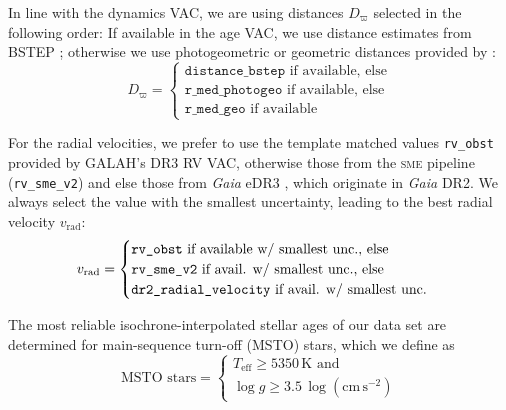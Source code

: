 \documentclass[fleqn,usenatbib]{mnras}
\newcommand{\Gaia}{\textit{Gaia}\xspace} %
\begin{document}
In line with the dynamics VAC, we are using distances $D_\varpi$ selected in the following order: If available in the age VAC, we use distance estimates from BSTEP \citep[a Bayesian isochrone interpolation tool used as part of GALAH+ DR3][]{Sharma2018}; otherwise we use photogeometric or geometric distances provided by \citet{BailerJones2021}:
\begin{equation} \label{eq:best_distance}
D_\varpi =
\begin{cases}
\texttt{distance\_bstep} \text{ if available, else} \\
\texttt{r\_med\_photogeo} \text{ if available, else} \\
\texttt{r\_med\_geo} \text{ if available}
\end{cases}
\end{equation}

For the radial velocities, we prefer to use the template matched values \texttt{rv\_obst} provided by GALAH's DR3 RV VAC, otherwise those from the \textsc{sme} pipeline (\texttt{rv\_sme\_v2}) and else those from \Gaia eDR3 \citep{Katz2019}, which originate in \Gaia DR2. We always select the value with the smallest uncertainty, leading to the best radial velocity $v_\text{rad}$:
\begin{equation} \label{eq:best_rv}
\centering
v_\text{rad} =
\begin{cases}
\texttt{rv\_obst} \text{ if available w/ smallest unc., else} \\
\texttt{rv\_sme\_v2} \text{ if avail. w/ smallest unc., else} \\
\texttt{dr2\_radial\_velocity} \text{ if avail. w/ smallest unc.}
\end{cases}
\end{equation}

The most reliable isochrone-interpolated stellar ages of our data set are determined for main-sequence turn-off (MSTO) stars, which we define as
\begin{equation} \label{eq:msto}
\text{MSTO stars} = 
\begin{cases}
T_\text{eff} \geq 5350\,\mathrm{K} \text{ and} \\
\log g \geq 3.5\,\mathrm{\log \left(cm\,s^{-2} \right)} 
\end{cases}
\end{equation}
\end{document}
